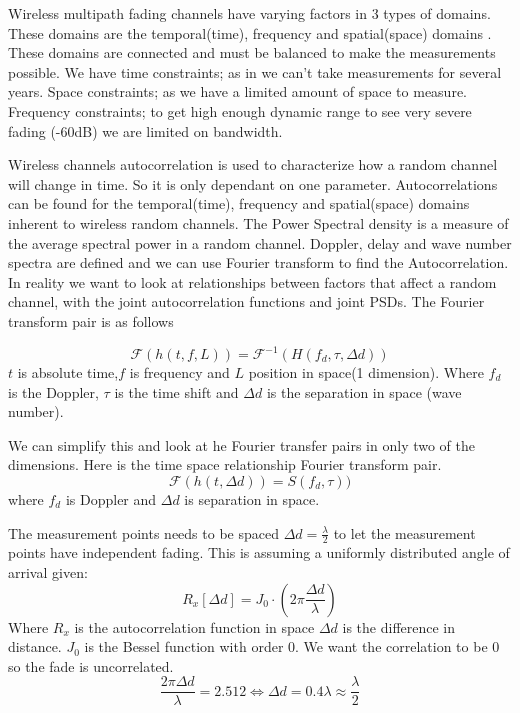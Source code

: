 Wireless multipath fading channels have varying factors in 3 types of domains. These domains are the temporal(time), frequency and spatial(space) domains \citep[p. 40-42]{stochasticWirelessChan}. These domains are connected and must be balanced to make the measurements possible. We have time constraints; as in we can't take measurements for several years. Space constraints; as we have a limited amount of space to measure. Frequency constraints; to get high enough dynamic range to see very severe fading (-60dB) we are limited on bandwidth.

Wireless channels autocorrelation is used to characterize how a random channel will change in time. So it is only dependant on one parameter. Autocorrelations can be found for the temporal(time), frequency and spatial(space) domains inherent to wireless random channels. The Power Spectral density is a measure of the average spectral power in a random channel. Doppler, delay and wave number spectra are defined and we can use Fourier transform to find the Autocorrelation. In reality we want to look at relationships between factors that affect a random channel, with the joint autocorrelation functions and joint PSDs\citep{SpaceWirelessChan}. The Fourier transform pair is as follows

\begin{equation}
\mathcal{F} ( h(t,f,L) ) =
\mathcal{F}^{-1} ( H(f_d,\tau,\Delta d) )
\end{equation}
$t$ is absolute time,$f$ is frequency and $L$ position in space(1 dimension).
Where $f_d$ is the Doppler, $\tau$ is the time shift and $\Delta d$ is the separation in space (wave number).

We can simplify this and look at he Fourier transfer pairs in only two of the dimensions. Here is the time space relationship Fourier transform pair.
\begin{equation}
\mathcal{F} ( h(t,\Delta d) ) =
 S(f_d,\tau) )
\end{equation}
where $f_d$ is Doppler and $\Delta d$ is separation in space.

The measurement points needs to be spaced $\Delta d = \frac{\lambda}{2}$ to let the measurement points have independent fading. This is assuming a uniformly distributed angle of arrival given:
\begin{equation}
R_x[\Delta d] = J_0\cdot(2\pi \frac{\Delta d}{\lambda})
\end{equation}
Where $R_x$ is the autocorrelation function in space $\Delta d$ is the difference in distance. $J_0$ is the Bessel function with order 0.
We want the correlation to be 0 so the fade is uncorrelated.
\begin{equation}
\frac{2\pi \Delta d}{\lambda} = 2.512 \Leftrightarrow \Delta d = 0.4 \lambda \approx \frac{\lambda}{2}
\end{equation}

